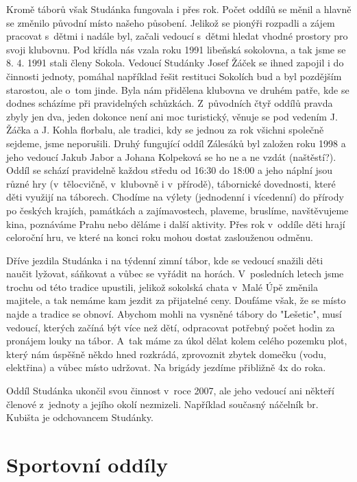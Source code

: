 \documentclass[a5paper, 11pt, twoside]{article}
\begin{document}
Kromě táborů však Studánka fungovala i přes rok. Počet oddílů se měnil a
hlavně se změnilo původní místo našeho působení. Jelikož se pionýři
rozpadli a zájem pracovat s~dětmi i nadále byl, začali vedoucí s~dětmi
hledat vhodné prostory pro svoji klubovnu. Pod křídla nás vzala roku
1991 libeňská sokolovna, a tak jsme se 8. 4. 1991 stali členy Sokola.
Vedoucí Studánky Josef Žáček se ihned zapojil i do činnosti jednoty,
pomáhal například řešit restituci Sokolích bud a byl pozdějším
starostou, ale o~tom jinde. Byla nám přidělena klubovna ve druhém patře,
kde se dodnes scházíme při pravidelných schůzkách. Z~původních čtyř
oddílů pravda zbyly jen dva, jeden dokonce není ani moc turistický,
věnuje se pod vedením J. Žáčka a J. Kohla florbalu, ale tradici, kdy se
jednou za rok všichni společně sejdeme, jsme neporušili. Druhý fungující
oddíl Zálesáků byl založen roku 1998 a jeho vedoucí Jakub Jabor a Johana
Kolpeková se ho ne a ne vzdát (naštěstí?). Oddíl se schází pravidelně
každou středu od 16:30 do 18:00 a jeho náplní jsou různé hry
(v~tělocvičně, v~klubovně i v~přírodě), tábornické dovednosti, které děti
využijí na táborech. Chodíme na výlety (jednodenní i vícedenní) do
přírody po českých krajích, památkách a zajímavostech, plaveme,
bruslíme, navštěvujeme kina, poznáváme Prahu nebo děláme i další
aktivity. Přes rok v~oddíle děti hrají celoroční hru, ve které na konci
roku mohou dostat zaslouženou odměnu.

Dříve jezdila Studánka i na týdenní zimní tábor, kde se vedoucí snažili
děti naučit lyžovat, sáňkovat a vůbec se vyřádit na horách. V~posledních
letech jsme trochu od této tradice upustili, jelikož sokolská chata
v~Malé Úpě změnila majitele, a tak nemáme kam jezdit za přijatelné ceny.
Doufáme však, že se místo najde a tradice se obnoví. Abychom mohli na
vysněné tábory do "Lešetic", musí vedoucí, kterých začíná být více než
dětí, odpracovat potřebný počet hodin za pronájem louky na tábor. A~tak
máme za úkol dělat kolem celého pozemku plot, který nám úspěšně někdo
hned rozkrádá, zprovoznit zbytek domečku (vodu, elektřina) a vůbec místo
udržovat. Na brigády jezdíme přibližně 4x do roka.

Oddíl Studánka ukončil svou činnost v~roce 2007, ale jeho vedoucí ani
někteří členové z~jednoty a jejího okolí nezmizeli. Například současný
náčelník br. Kubišta je odchovancem Studánky.

\section{Sportovní oddíly}
\end{document}
